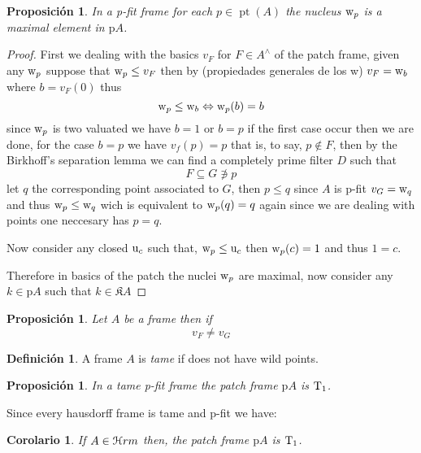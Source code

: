 \documentclass[11pt]{amsart}
\DeclareMathOperator{\pt}{pt}
\newcommand{\niton}{\not\owns}
\theoremstyle{plain}
\newtheorem{cor}[thm]{Corolario}
\newtheorem{prop}[thm]{Proposición}
\theoremstyle{definition}
\newtheorem{dfn}[thm]{Definición}
\begin{document}
\begin{prop}\label{fitpro}
In a {\rm p-fit} frame for each $p\in\pt(A)$ the nucleus ${\rm w}_{p}$ is a maximal element in $\mathrm{p}A$.
\end{prop}



\begin{proof}\label{maxp}
First we dealing with the basics $v_{F}$ for $F\in A^{\wedge}$ of the patch frame, given any ${\rm w}_{p}$ suppose that  
${\rm w}_{p} \leq v_{F}$ then by (propiedades generales de los w) $v_{F}={\rm w}_{b}$ where $b=v_{F}(0)$ thus \[{\rm w}_{p}\leq {\rm w}_{b}\Leftrightarrow {\rm w}_{p}(b)=b\]
 since ${\rm w}_{p}$ is two valuated we have $b=1$ or $b=p$  if the first case occur then we are done, for the case $b=p$ we have $v_{f}(p)=p$ that is, to say, $p\notin F$,
 then by the Birkhoff's separation lemma we can find a completely prime filter $D$ such that \[F\subseteq G\niton p\] let $q$ the corresponding point associated to $G$, then $p\leq q$ since $A$ is 
 {\rm p-fit} $v_{G}={\rm w}_{q}$ and thus ${\rm w}_{p}\leq {\rm w}_{q}$ wich is equivalent to ${\rm w}_{p}(q)=q$ again since we are dealing with points one neccesary has $p=q$.

 Now consider any closed ${\rm u}_{c}$ such that, ${\rm w}_{p}\leq {\rm u}_{c}$ then ${\rm w}_{p}(c)=1$ and thus $1=c$.

 Therefore in basics of the patch the nuclei ${\rm w}_{p}$ are maximal, now consider any $k\in\mathrm{p}A$ such that $k\in\mathfrak{K}A$
\end{proof}


\begin{prop}\label{kcf}
Let $A$ be a frame then if \[v_{F}\neq v_{G}\]
\end{prop}




\begin{dfn}\label{tame}
A frame $A$ is \emph{tame} if does not have wild points.
\end{dfn}


\begin{prop}\label{fitpro1}
	In a tame {\rm p-fit} frame the patch frame  $\mathrm{p}A$ is ${\rm T}_{1}$.
	\end{prop}

Since every hausdorff frame is tame and {\rm p-fit} we have:

	\begin{cor}\label{fitpro2}
		If $A\in\EuScript{H}rm$ then, the patch frame  $\mathrm{p}A$ is ${\rm T}_{1}$.
	\end{cor}	
\end{document}
